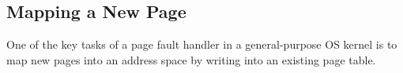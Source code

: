 \begin{comment}
This still works with the modality, since that invariant is also semantically a predicate on a page table root.
Let's call this v2.
}
\todo[inline]{the current course of action is to finish the WPs for v1 and try an example that should work with either approach (like the task switch). This is a good basic sanity check on our approaches. Once that's done, then we work out the details of v2, which should require \emph{refactoring} the same sorts of reasoning we had for v1, rather than totally different proofs from v1.}
\end{comment}
\subsection{Mapping a New Page}
One of the key tasks of a page fault handler in a general-purpose OS kernel is to map new pages into an address space by writing into an existing page table.
